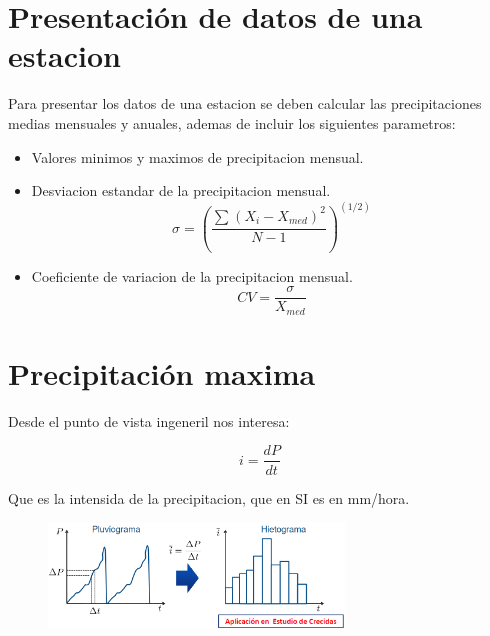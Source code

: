 \section{Presentación de datos de una estacion}

Para presentar los datos de una estacion se deben calcular las precipitaciones medias mensuales y anuales, ademas de incluir los siguientes parametros:\\

\begin{itemize}
    \item Valores minimos y maximos de precipitacion mensual.
    \item Desviacion estandar de la precipitacion mensual.\\
    \begin{equation}
        \sigma = (\frac{\sum_{}^{} (X_i - X_{med})^2}{N-1})^{(1/2)}
    \end{equation}
    \item Coeficiente de variacion de la precipitacion mensual.\\
    \begin{equation}
        CV = \frac{\sigma}{X_{med}}
    \end{equation}
\end{itemize} 

\section{Precipitación maxima}

Desde el punto de vista ingeneril nos interesa:

\begin{equation}
    i = \frac{dP}{dt}
\end{equation}

Que es la intensida de la precipitacion, que en SI es en mm/hora.\\

\begin{figure}[H]
    \centering
    \includegraphics[width=0.7\textwidth]{imagenes/hietograma.png}
    \label{hietograma}
\end{figure}

